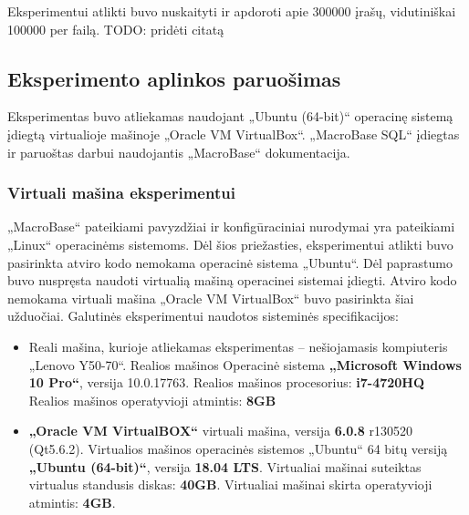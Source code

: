 \documentclass{VUMIFPSbakalaurinis}
\begin{document}
Eksperimentui atlikti buvo nuskaityti ir apdoroti apie 300000 įrašų, vidutiniškai 100000 per failą.
TODO: pridėti citatą
\subsection{Eksperimento aplinkos paruošimas}
Eksperimentas buvo atliekamas naudojant „Ubuntu (64-bit)“ operacinę sistemą įdiegtą virtualioje mašinoje „Oracle VM VirtualBox“. „MacroBase SQL“ įdiegtas ir paruoštas darbui naudojantis „MacroBase“ dokumentacija.

\subsubsection{Virtuali mašina eksperimentui}
„MacroBase“ pateikiami pavyzdžiai ir konfigūraciniai nurodymai yra pateikiami „Linux“ operacinėms sistemoms. Dėl šios priežasties, eksperimentui atlikti buvo pasirinkta atviro kodo nemokama operacinė sistema „Ubuntu“. Dėl paprastumo buvo nuspręsta naudoti virtualią mašiną operacinei sistemai įdiegti. Atviro kodo nemokama virtuali mašina „Oracle VM VirtualBox“ buvo pasirinkta šiai užduočiai. Galutinės eksperimentui naudotos sisteminės specifikacijos:
\begin{itemize}
	\item Reali mašina, kurioje atliekamas eksperimentas – nešiojamasis kompiuteris „Lenovo Y50-70“.
		\subitem Realios mašinos Operacinė sistema \textbf{„Microsoft Windows 10 Pro“}, versija	10.0.17763.
		\subitem Realios mašinos procesorius: \textbf{i7-4720HQ}
		\subitem Realios mašinos operatyvioji atmintis: \textbf{8GB}
	\item \textbf{„Oracle VM VirtualBOX“} virtuali mašina, versija  \textbf{6.0.8} r130520 (Qt5.6.2).
		\subitem Virtualios mašinos operacinės sistemos „Ubuntu“ 64 bitų versiją \textbf{„Ubuntu (64-bit)“}, versija \textbf{18.04 LTS}.
		\subitem Virtualiai mašinai suteiktas virtualus standusis diskas: \textbf{40GB}.
		\subitem Virtualiai mašinai skirta operatyvioji atmintis: \textbf{4GB}.
\end{itemize}
\end{document}
